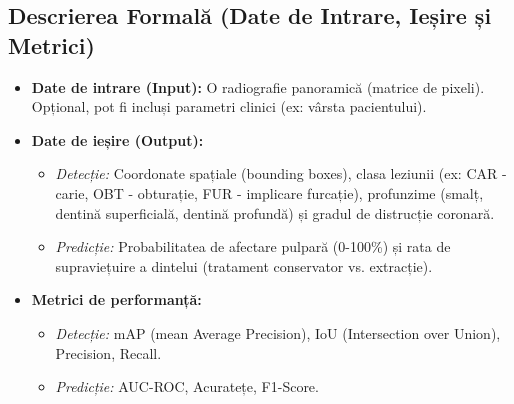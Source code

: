 \documentclass[12pt,a4paper]{article}
\begin{document}
\subsection{Descrierea Formală (Date de Intrare, Ieșire și Metrici)}
\begin{itemize}
    \item \textbf{Date de intrare (Input):} O radiografie panoramică (matrice de pixeli). Opțional, pot fi incluși parametri clinici (ex: vârsta pacientului).
    \item \textbf{Date de ieșire (Output):}
    \begin{itemize}
        \item \textit{Detecție:} Coordonate spațiale (bounding boxes), clasa leziunii (ex: CAR - carie, OBT - obturație, FUR - implicare furcație), profunzime (smalț, dentină superficială, dentină profundă) și gradul de distrucție coronară.
        \item \textit{Predicție:} Probabilitatea de afectare pulpară (0-100\%) și rata de supraviețuire a dintelui (tratament conservator vs. extracție).
    \end{itemize}
    \item \textbf{Metrici de performanță:}
    \begin{itemize}
        \item \textit{Detecție:} mAP (mean Average Precision), IoU (Intersection over Union), Precision, Recall.
        \item \textit{Predicție:} AUC-ROC, Acuratețe, F1-Score.
    \end{itemize}
\end{itemize}
\end{document}
